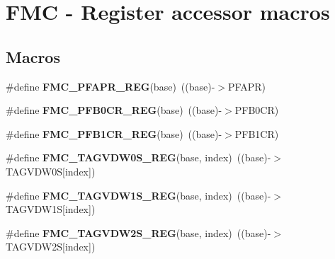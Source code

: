 \hypertarget{group__FMC__Register__Accessor__Macros}{}\section{F\+MC -\/ Register accessor macros}
\label{group__FMC__Register__Accessor__Macros}
\subsection*{Macros}
\begin{DoxyCompactItemize}
\item 
\#define {\bfseries F\+M\+C\+\_\+\+P\+F\+A\+P\+R\+\_\+\+R\+EG}(base)~((base)-\/$>$P\+F\+A\+PR)\hypertarget{group__FMC__Register__Accessor__Macros_ga7665629e583f9fcadd41da61df6f735a}{}\label{group__FMC__Register__Accessor__Macros_ga7665629e583f9fcadd41da61df6f735a}

\item 
\#define {\bfseries F\+M\+C\+\_\+\+P\+F\+B0\+C\+R\+\_\+\+R\+EG}(base)~((base)-\/$>$P\+F\+B0\+CR)\hypertarget{group__FMC__Register__Accessor__Macros_ga649247bd1f9692d5676abc8295aa760f}{}\label{group__FMC__Register__Accessor__Macros_ga649247bd1f9692d5676abc8295aa760f}

\item 
\#define {\bfseries F\+M\+C\+\_\+\+P\+F\+B1\+C\+R\+\_\+\+R\+EG}(base)~((base)-\/$>$P\+F\+B1\+CR)\hypertarget{group__FMC__Register__Accessor__Macros_gab2e6001f0fe90cc1e40413b4de0998f7}{}\label{group__FMC__Register__Accessor__Macros_gab2e6001f0fe90cc1e40413b4de0998f7}

\item 
\#define {\bfseries F\+M\+C\+\_\+\+T\+A\+G\+V\+D\+W0\+S\+\_\+\+R\+EG}(base,  index)~((base)-\/$>$T\+A\+G\+V\+D\+W0S\mbox{[}index\mbox{]})\hypertarget{group__FMC__Register__Accessor__Macros_ga3282a41aef2d6dda9997b0b3c273bb5e}{}\label{group__FMC__Register__Accessor__Macros_ga3282a41aef2d6dda9997b0b3c273bb5e}

\item 
\#define {\bfseries F\+M\+C\+\_\+\+T\+A\+G\+V\+D\+W1\+S\+\_\+\+R\+EG}(base,  index)~((base)-\/$>$T\+A\+G\+V\+D\+W1S\mbox{[}index\mbox{]})\hypertarget{group__FMC__Register__Accessor__Macros_ga46414611eff014d9addd13d6f03bcb20}{}\label{group__FMC__Register__Accessor__Macros_ga46414611eff014d9addd13d6f03bcb20}

\item 
\#define {\bfseries F\+M\+C\+\_\+\+T\+A\+G\+V\+D\+W2\+S\+\_\+\+R\+EG}(base,  index)~((base)-\/$>$T\+A\+G\+V\+D\+W2S\mbox{[}index\mbox{]})\hypertarget{group__FMC__Register__Accessor__Macros_gad38efd11667432ffac106977963f4317}{}\label{group__FMC__Register__Accessor__Macros_gad38efd11667432ffac106977963f4317}


\end{DoxyCompactItemize}
